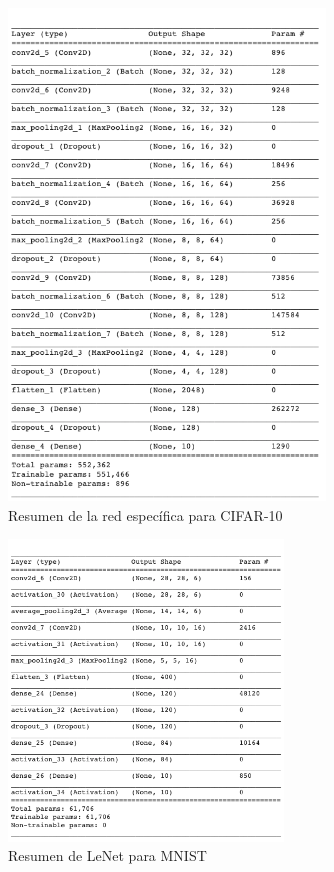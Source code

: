 \begin{figure}[h!]
    \centering
    \includegraphics[width=0.75\textwidth]{images/model_details/cifar_summary.png}
    \caption{Resumen de la red específica para CIFAR-10 \cite{cifar_nb}}
    \label{cifar summary}
\end{figure}

\begin{figure}[h!]
    \centering
    \includegraphics[width=0.65\textwidth]{images/model_details/mnist_linear_good_summary.png}
    \caption{Resumen de LeNet para MNIST}
    \label{lenet summary}
\end{figure}

